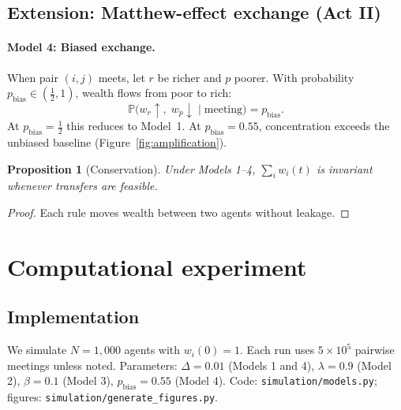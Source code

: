 \documentclass[12pt,a4paper]{article}
\newtheorem{proposition}{Proposition}
\begin{document}
\subsection{Extension: Matthew-effect exchange (Act II)}

\paragraph{Model 4: Biased exchange.}
When pair $(i,j)$ meets, let $r$ be richer and $p$ poorer.
With probability $p_{\text{bias}} \in (\tfrac{1}{2}, 1)$, wealth flows from poor to rich:
\begin{equation}
  \mathbb{P}\big(w_r \uparrow,\; w_p \downarrow \;\big|\; \text{meeting}\big) = p_{\text{bias}}.
  \label{eq:matthew}
\end{equation}
At $p_{\text{bias}} = \tfrac{1}{2}$ this reduces to Model~1.
At $p_{\text{bias}} = 0.55$, concentration exceeds the unbiased baseline (Figure~\ref{fig:amplification}).

\begin{proposition}[Conservation]
  Under Models 1--4, $\sum_i w_i(t)$ is invariant whenever transfers are feasible.
\end{proposition}

\begin{proof}
Each rule moves wealth between two agents without leakage.
\end{proof}

\section{Computational experiment}
\label{sec:simulation}

\subsection{Implementation}

We simulate $N = 1{,}000$ agents with $w_i(0) = 1$.
Each run uses $5 \times 10^5$ pairwise meetings unless noted.
Parameters: $\Delta = 0.01$ (Models 1 and 4), $\lambda = 0.9$ (Model 2), $\beta = 0.1$ (Model 3), $p_{\text{bias}} = 0.55$ (Model 4).
Code: \texttt{simulation/models.py}; figures: \texttt{simulation/generate\_figures.py}.

\end{document}
